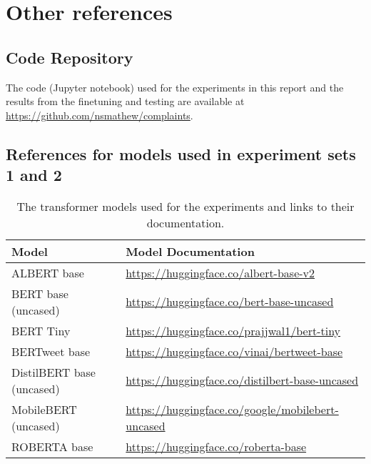 
\chapter{Other references}

\section{Code Repository}
The code (Jupyter notebook) used for the experiments in this report and the results from the finetuning and testing are available at \url{https://github.com/nsmathew/complaints}.

\section{References for models used in experiment sets 1 and 2}

\begin{table}[ht]
    \captionsetup{font=small}
    \centering
    \begin{tabularx}{\textwidth}{|l|X|}
        \hline
        \rowcolor[gray]{0.7}
        \textbf{Model}            & \textbf{Model Documentation}                                   \\
        \hline

        ALBERT base               & \small{\url{https://huggingface.co/albert-base-v2}}            \\
        \hline
        BERT base (uncased)       & \small{\url{https://huggingface.co/bert-base-uncased}}         \\
        \hline
        BERT Tiny                 & \small{\url{https://huggingface.co/prajjwal1/bert-tiny}}       \\
        \hline
        BERTweet base             & \small{\url{https://huggingface.co/vinai/bertweet-base}}       \\
        \hline
        DistilBERT base (uncased) & \small{\url{https://huggingface.co/distilbert-base-uncased}}   \\
        \hline
        MobileBERT (uncased)      & \small{\url{https://huggingface.co/google/mobilebert-uncased}} \\
        \hline
        ROBERTA base              & \small{\url{https://huggingface.co/roberta-base}}              \\
        \hline
    \end{tabularx}
    \caption{The transformer models used for the experiments and links to their documentation.}
    \label{tab: apdxb_model_doc}
\end{table}

